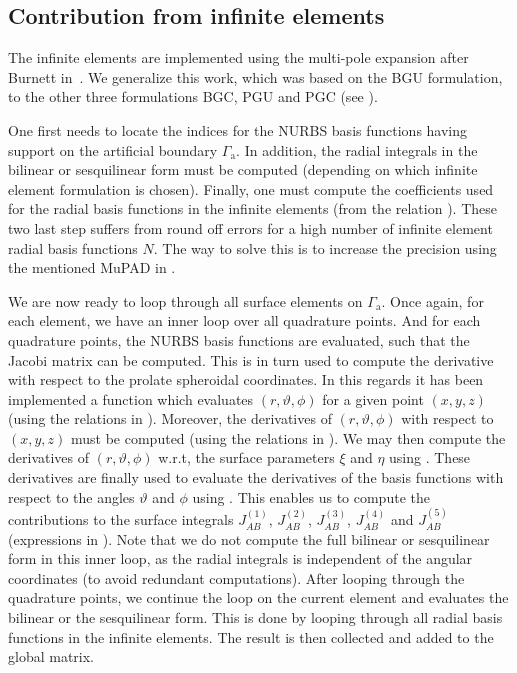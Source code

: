 \subsection{Contribution from infinite elements}
The infinite elements are implemented using the multi-pole expansion after Burnett in~\cite{Burnett1994atd}. We generalize this work, which was based on the BGU formulation, to the other three formulations BGC, PGU and PGC (see ).

One first needs to locate the indices for the NURBS basis functions having support on the artificial boundary $\Gamma_{\mathrm{a}}$. In addition, the radial integrals in the bilinear or sesquilinear form must be computed (depending on which infinite element formulation is chosen). Finally, one must compute the coefficients used for the radial basis functions in the infinite elements (from the relation ). These two last step suffers from round off errors for a high number of infinite element radial basis functions $N$. The way to solve this is to increase the precision using the mentioned MuPAD in \MATLAB.

We are now ready to loop through all surface elements on $\Gamma_{\mathrm{a}}$. Once again, for each element, we have an inner loop over all quadrature points. And for each quadrature points, the NURBS basis functions are evaluated, such that the Jacobi matrix can be computed. This is in turn used to compute the derivative with respect to the prolate spheroidal coordinates. In this regards it has been implemented a function which evaluates $(r,\vartheta,\phi)$ for a given point $(x,y,z)$ (using the relations in ). Moreover, the derivatives of $(r,\vartheta,\phi)$ with respect to $(x,y,z)$ must be computed (using the relations in ). We may then compute the derivatives of $(r,\vartheta,\phi)$ w.r.t, the surface parameters $\xi$ and $\eta$ using . These derivatives are finally used to evaluate the derivatives of the basis functions with respect to the angles $\vartheta$ and $\phi$ using . This enables us to compute the contributions to the surface integrals $J_{AB}^{(1)}$, $J_{AB}^{(2)}$, $J_{AB}^{(3)}$, $J_{AB}^{(4)}$ and $J_{AB}^{(5)}$ (expressions in ). Note that we do not compute the full bilinear or sesquilinear form in this inner loop, as the radial integrals is independent of the angular coordinates (to avoid redundant computations). After looping through the quadrature points, we continue the loop on the current element and evaluates the bilinear or the sesquilinear form. This is done by looping through all radial basis functions in the infinite elements. The result is then collected and added to the global matrix.

